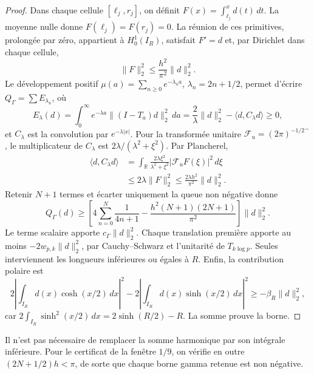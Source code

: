 \begin{proof}
Dans chaque cellule \([\ell_j,r_j]\), on définit
\(F(x)=\int_{\ell_j}^x d(t)\,dt\). La moyenne nulle donne
\(F(\ell_j)=F(r_j)=0\). La réunion de ces primitives, prolongée
par zéro, appartient à \(H_0^1(I_R)\), satisfait \(F'=d\) et, par
Dirichlet dans chaque cellule,
\begin{equation}
\|F\|_2^2\leq\frac{h^2}{\pi^2}\|d\|_2^2.
\label{viii:schur-add-primitiva}
\end{equation}
Le développement positif
\(\mu(a)=\sum_{n\geq0}e^{-\lambda_n a}\), \(\lambda_n=2n+1/2\),
permet d'écrire \(Q_\Gamma=\sum E_{\lambda_n}\), où
\begin{equation}
E_\lambda(d)=\int_0^\infty e^{-\lambda a}
 \|(I-T_a)d\|_2^2\,da
 =\frac2\lambda\|d\|_2^2-\langle d,C_\lambda d\rangle\geq0,
\label{viii:schur-add-energia-lambda}
\end{equation}
et \(C_\lambda\) est la convolution par \(e^{-\lambda|x|}\).
Pour la transformée unitaire
\(\mathcal F_u=(2\pi)^{-1/2}\widehat{\phantom f}\), le multiplicateur
de \(C_\lambda\) est \(2\lambda/(\lambda^2+\xi^2)\). Par Plancherel,
\begin{equation}
\begin{aligned}
\langle d,C_\lambda d\rangle
&=\int_{\mathbb R}\frac{2\lambda\xi^2}{\lambda^2+\xi^2}
 |\mathcal F_uF(\xi)|^2\,d\xi\\
&\leq2\lambda\|F\|_2^2
 \leq\frac{2\lambda h^2}{\pi^2}\|d\|_2^2 .
\end{aligned}
\label{viii:schur-add-cota-convolucion}
\end{equation}
Retenir \(N+1\) termes et écarter uniquement la queue non négative donne
\[
Q_\Gamma(d)\geq
\left[4\sum_{n=0}^N\frac1{4n+1}
-\frac{h^2(N+1)(2N+1)}{\pi^2}\right]\|d\|_2^2.
\]
Le terme scalaire apporte \(c_\Gamma\|d\|_2^2\). Chaque translation première apporte au moins \(-2w_{p,k}\|d\|_2^2\), par Cauchy--Schwarz et l'unitarité de \(T_{k\log p}\). Seules interviennent les longueurs inférieures ou égales à \(R\). Enfin, la contribution polaire est
\[
2\left|\int_{I_R}d(x)\cosh(x/2)\,dx\right|^2
-2\left|\int_{I_R}d(x)\sinh(x/2)\,dx\right|^2
\geq-\beta_R\|d\|_2^2,
\]
car \(2\int_{I_R}\sinh^2(x/2)\,dx=2\sinh(R/2)-R\).
La somme prouve la borne.
\end{proof}
Il n'est pas nécessaire de remplacer la somme harmonique par son intégrale inférieure.
Pour le certificat de la fenêtre \(1/9\), on vérifie en outre
\((2N+1/2)h<\pi\), de sorte que chaque borne gamma retenue est non négative.

